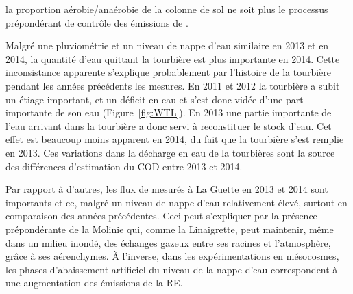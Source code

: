 la proportion aérobie/anaérobie de la colonne de sol ne soit plus le processus prépondérant de contrôle des émissions de \chh.


Malgré une pluviométrie et un niveau de nappe d'eau similaire en 2013 et en 2014, la quantité d'eau quittant la tourbière est plus importante en 2014.
Cette inconsistance apparente s'explique probablement par l'histoire de la tourbière pendant les années précédents les mesures.
En 2011 et 2012 la tourbière a subit un étiage important, et un déficit en eau et s'est donc vidée d'une part importante de son eau (Figure~\ref{fig:WTL}).
En 2013 une partie importante de l'eau arrivant dans la tourbière a donc servi à reconstituer le stock d'eau.
Cet effet est beaucoup moins apparent en 2014, du fait que la tourbière s'est remplie en 2013.
Ces variations dans la décharge en eau de la tourbières sont la source des différences d'estimation du COD entre 2013 et 2014.

Par rapport à d'autres, les flux de \coo mesurés à La Guette en 2013 et 2014 sont importants et ce, malgré un niveau de nappe d'eau relativement élevé, surtout en comparaison des années précédentes.
Ceci peut s'expliquer par la présence prépondérante de la Molinie qui, comme la Linaigrette, peut maintenir, même dans un milieu inondé, des échanges gazeux entre ses racines et l'atmosphère, grâce à ses aérenchymes.
À l'inverse, dans les expérimentations en mésocosmes, les phases d'abaissement artificiel du niveau de la nappe d'eau correspondent à une augmentation des émissions de la RE.

